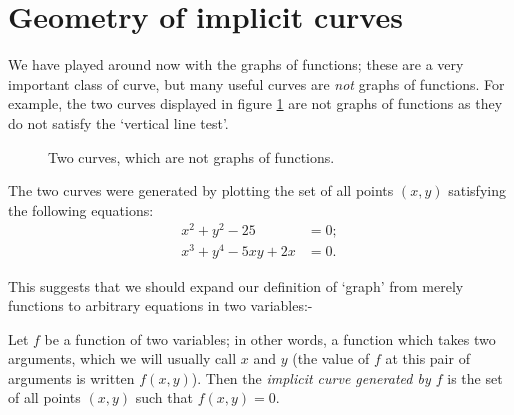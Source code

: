 \section{Geometry of implicit curves}
We have played around now with the graphs of functions; these are a very important class of curve, but many useful
curves are \emph{not} graphs of functions. For example, the two curves displayed in figure \ref{fig:implicit1} are
not graphs of functions as they do not satisfy the `vertical line test'.

\begin{figure}
  \centering
  \caption{Two curves, which are not graphs of functions.\label{fig:implicit1}}
\end{figure}

The two curves were generated by plotting the set of all points $ (x,y) $ satisfying the following equations:
\begin{align*}
  x^2 + y^2 - 25 &= 0; \tag{black}\\
  x^3 + y^4 - 5xy + 2x &= 0. \tag{red}
\end{align*}

This suggests that we should expand our definition of `graph' from merely functions to arbitrary equations in two variables:-
\begin{defn}
  Let $ f $ be a function of two variables; in other words, a function which takes two arguments, which we will usually call $ x $ and $ y $
  (the value of $ f $ at this pair of arguments is written $ f(x,y) $). Then the \emph{implicit curve generated by $ f $} is the set of all
  points $ (x,y) $ such that $ f(x,y) = 0 $.
\end{defn}

